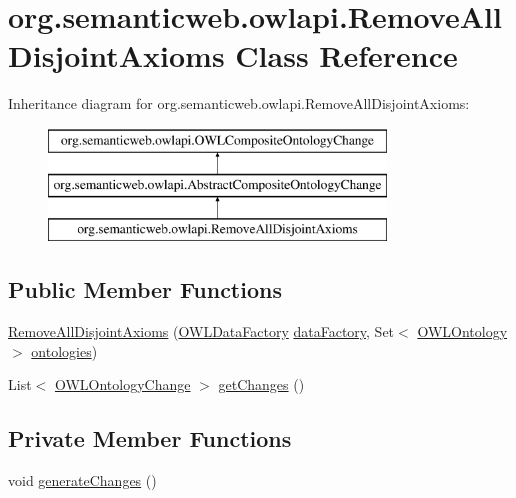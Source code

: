 \hypertarget{classorg_1_1semanticweb_1_1owlapi_1_1_remove_all_disjoint_axioms}{\section{org.\-semanticweb.\-owlapi.\-Remove\-All\-Disjoint\-Axioms Class Reference}
\label{classorg_1_1semanticweb_1_1owlapi_1_1_remove_all_disjoint_axioms}
}
Inheritance diagram for org.\-semanticweb.\-owlapi.\-Remove\-All\-Disjoint\-Axioms\-:\begin{figure}[H]
\begin{center}
\leavevmode
\includegraphics[height=3.000000cm]{classorg_1_1semanticweb_1_1owlapi_1_1_remove_all_disjoint_axioms}
\end{center}
\end{figure}
\subsection*{Public Member Functions}
\begin{DoxyCompactItemize}
\item 
\hyperlink{classorg_1_1semanticweb_1_1owlapi_1_1_remove_all_disjoint_axioms_ae997ec7ca19351a57e11357327572c29}{Remove\-All\-Disjoint\-Axioms} (\hyperlink{interfaceorg_1_1semanticweb_1_1owlapi_1_1model_1_1_o_w_l_data_factory}{O\-W\-L\-Data\-Factory} \hyperlink{classorg_1_1semanticweb_1_1owlapi_1_1_abstract_composite_ontology_change_aebcfd0601543ebb5f72b1fe53a5352c9}{data\-Factory}, Set$<$ \hyperlink{interfaceorg_1_1semanticweb_1_1owlapi_1_1model_1_1_o_w_l_ontology}{O\-W\-L\-Ontology} $>$ \hyperlink{classorg_1_1semanticweb_1_1owlapi_1_1_remove_all_disjoint_axioms_aaf533ab6481535266cfea2c0c22410c9}{ontologies})
\item 
List$<$ \hyperlink{classorg_1_1semanticweb_1_1owlapi_1_1model_1_1_o_w_l_ontology_change}{O\-W\-L\-Ontology\-Change} $>$ \hyperlink{classorg_1_1semanticweb_1_1owlapi_1_1_remove_all_disjoint_axioms_a12626e589fe15228f8232d9a1c232f6d}{get\-Changes} ()
\end{DoxyCompactItemize}
\subsection*{Private Member Functions}
\begin{DoxyCompactItemize}
\item 
void \hyperlink{classorg_1_1semanticweb_1_1owlapi_1_1_remove_all_disjoint_axioms_a136523482c9ceda997a8b5ec7ac1d0e1}{generate\-Changes} ()
\end{DoxyCompactItemize}
